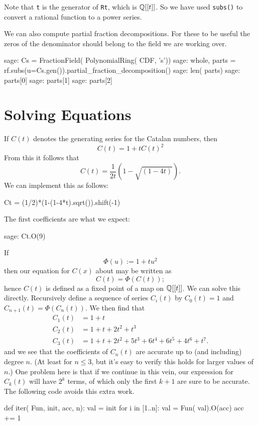 Note that \verb|t| is the generator of \verb|Rt|, which is ${\mathbb Q}[[t]]$.
So we have used \verb|subs()| to convert a rational function to
a power series.

We can also compute partial fraction decompositions. For these
to be useful the zeros of the denominator should belong to the field
we are working over.

\begin{sageexample}
sage: Cs = FractionField( PolynomialRing( CDF, 's'))
sage: whole, parts = rf.subs(u=Cs.gen()).partial_fraction_decomposition() 
sage: len( parts)
sage: parts[0]
sage: parts[1]
sage: parts[2]  
\end{sageexample}

\section{Solving Equations}

If $C(t)$ denotes the generating series for the Catalan numbers, then
\[
    C(t) = 1+tC(t)^2
\]
From this it follows that
\[
    C(t) = \frac{1}{2t}(1-\sqrt{(1-4t)}).
\]
We can implement this as follows:
\begin{sageblock}
    Ct = (1/2)*(1-(1-4*t).sqrt()).shift(-1)
\end{sageblock}
The first coefficients are what we expect:
\begin{sageexample}
sage: Ct.O(9)
\end{sageexample}

If
\[
    \Phi(u) := 1+tu^2
\]
then our equation for $C(x)$ about may be written as
\[
    C(t) = \Phi(C(t));
\]
hence $C(t)$ is defined as a fixed point of a map on ${\mathbb Q}[[t]]$.
We can solve this directly. Recursively define a sequence of series $C_i(t)$ 
by $C_0(t)=1$ and $C_{n+1}(t) =\Phi(C_n(t))$.
We then find that
\begin{align*}
    C_1(t) &= 1 + t\\
    C_2(t) &= 1 + t + 2t^2 + t^3\\
    C_3(t) &= 1 + t + 2t^{2} + 5t^{3} + 6t^{4} + 6t^{5} + 4t^{6} + t^{7}.
\end{align*}
and we see that the coefficients of $C_n(t)$ are accurate up to 
(and including) degree $n$. (At least for $n\le3$, but it's easy to 
verify this holds for larger values of $n$.) One problem
here is that if we continue in this vein, our expression for $C_k(t)$
will have $2^k$ terms, of which only the first $k+1$ are sure to be accurate.
The following code avoids this extra work.
\begin{sageblock}
def iter( Fun, init, acc, n):
    val = init
    for i in [1..n]:
        val = Fun( val).O(acc)
        acc += 1
\end{sageblock}

